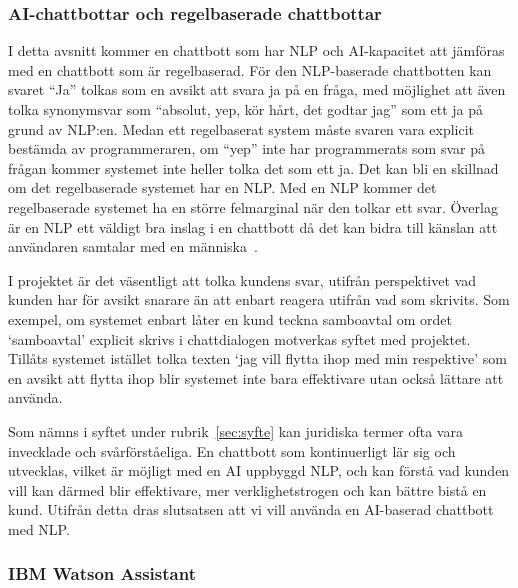 \documentclass[a4paper,12pt]{article}
\begin{document}
\subsubsection{AI-chattbottar och regelbaserade chattbottar}
\label{sec:ai:vs:regel}

I detta avsnitt kommer en chattbott som har NLP och AI-kapacitet att jämföras med en chattbott som är regelbaserad. För den NLP-baserade chattbotten kan svaret ``Ja'' tolkas som en avsikt att svara ja på en fråga, med möjlighet att även tolka synonymsvar som ``absolut, yep, kör hårt, det godtar jag'' som ett ja på grund av NLP:en. Medan ett regelbaserat system måste svaren vara explicit bestämda av programmeraren, om ``yep'' inte har programmerats som svar på frågan kommer systemet inte heller tolka det som ett ja. Det kan bli en skillnad om det regelbaserade systemet har en NLP. Med en NLP kommer det regelbaserade systemet ha en större felmarginal när den tolkar ett svar. Överlag är en NLP ett väldigt bra inslag i en chattbott då det kan bidra till känslan att användaren samtalar med en människa~\cite{web:chatbotmagazine-paul-boutin}. 

I projektet är det väsentligt att tolka kundens svar, utifrån perspektivet vad kunden har för avsikt snarare än att enbart reagera utifrån vad som skrivits. Som exempel, om systemet enbart låter en kund teckna samboavtal om ordet `samboavtal' explicit skrivs i chattdialogen motverkas syftet med projektet. Tillåts systemet istället tolka texten `jag vill flytta ihop med min respektive' som en avsikt att flytta ihop blir systemet inte bara effektivare utan också lättare att använda. 

Som nämns i syftet under rubrik~\ref{sec:syfte} kan juridiska termer ofta vara invecklade och svår\-förståe\-liga. En chattbott som kontinuerligt lär sig och utvecklas, vilket är möjligt med en AI uppbyggd NLP, och kan förstå vad kunden vill kan därmed blir effektivare, mer verklighetstrogen och kan bättre bistå en kund. Utifrån detta dras slutsatsen att vi vill använda en AI-baserad chattbott med NLP.

\subsubsection{IBM Watson Assistant}
\label{subsec:IBM-watson-ass}
\FloatBarrier
\end{document}
